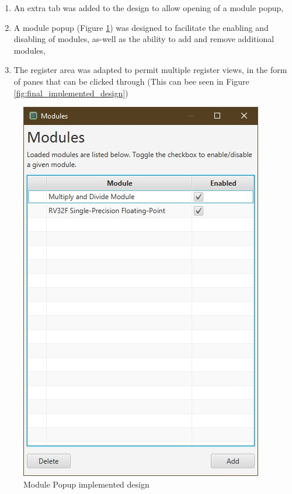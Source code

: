 \begin{enumerate}
    \item An extra tab was added to the design to allow opening of a module popup,
    \item A module popup (Figure \ref{fig:module_popup_design}) was designed to facilitate the enabling and disabling of modules, as-well as the ability to add and remove additional modules,
    \item The register area was adapted to permit multiple register views, in the form of panes that can be clicked through (This can bee seen in Figure \ref{fig:final_implemented_design})
\end{enumerate}

\begin{figure}[H]
    \centering
    \includegraphics[width=0.4\linewidth]{dissertation/DATA/module_popup.jpg}
    \caption{Module Popup implemented design}
    \label{fig:module_popup_design}
\end{figure}
